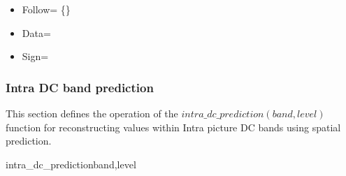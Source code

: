 \begin{itemize}
\item{Follow= \{\QOffsetFollow\}}
\item{Data=\QOffsetInfo}
\item{Sign=\QOffsetSign}
\end{itemize}

\subsubsection{Intra DC band prediction}
\label{intradcprediction}

This section defines the operation of the $intra\_dc\_prediction(band,level)$ function
for reconstructing values within Intra picture DC bands using spatial prediction.

\begin{pseudo}{intra\_dc\_prediction}{band,level}

      \bsEND
    \bsELSE
      \bsEND
    \bsEND
  \bsEND
\bsEND

\end{pseudo}
